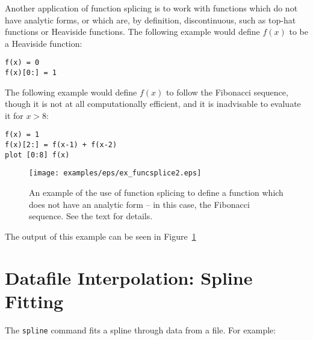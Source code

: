 \documentclass[a4paper,onecolumn,11pt]{book}
\begin{document}
Another application of function splicing is to work with functions which do not
have analytic forms, or which are, by definition, discontinuous, such as
top-hat functions or Heaviside functions. The following example would define
$f(x)$ to be a Heaviside function:

\begin{verbatim}
f(x) = 0
f(x)[0:] = 1
\end{verbatim}

\noindent The following example would define $f(x)$ to follow the Fibonacci
sequence, though it is not at all computationally efficient, and it is
inadvisable to evaluate it for $x>8$:

\begin{verbatim}
f(x) = 1
f(x)[2:] = f(x-1) + f(x-2)
plot [0:8] f(x)
\end{verbatim}

\begin{figure}
\begin{center}
\texttt{[image: examples/eps/ex\_funcsplice2.eps]}
\end{center}
\caption{An example of the use of function splicing to define a function which does not have an analytic form -- in this case, the Fibonacci sequence. See the text for details.}
\label{fig:ex_funcsplice2}
\end{figure}

\noindent The output of this example can be seen in Figure~\ref{fig:ex_funcsplice2}

\section{Datafile Interpolation: Spline Fitting}
\label{spline_command}

%
%
The \texttt{spline} command fits a
spline through data from a file.  For example:
\end{document}
